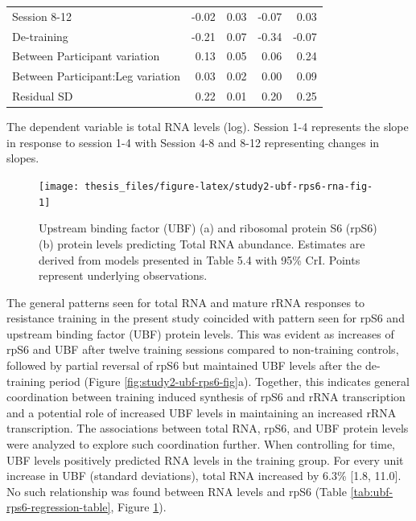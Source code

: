 \documentclass[twoside,10pt]{gihclass} %
\begin{document}
\begin{table}
\begin{threeparttable}
\begin{tabular}[t]{lrrrr}
\hspace{1em}Session 8-12 & -0.02 & 0.03 & -0.07 & 0.03\\
\hspace{1em}De-training & -0.21 & 0.07 & -0.34 & -0.07\\
\hspace{1em}Between Participant variation & 0.13 & 0.05 & 0.06 & 0.24\\
\hspace{1em}Between Participant:Leg variation & 0.03 & 0.02 & 0.00 & 0.09\\
\hspace{1em}Residual SD & 0.22 & 0.01 & 0.20 & 0.25\\
\bottomrule
\end{tabular}
\begin{tablenotes}[para]
\item The dependent variable is total RNA levels (log). Session 1-4 represents the slope in response to session 1-4 with Session 4-8 and 8-12 representing changes in slopes.
\end{tablenotes}
\end{threeparttable}
\end{table}
\begin{figure}

{\centering \texttt{[image: thesis\_files/figure-latex/study2-ubf-rps6-rna-fig-1]} 

}

\caption[Total RNA levels predicted by UBF and rpS6 protein in Study II.]{Upstream binding factor (UBF) (a) and ribosomal protein S6 (rpS6) (b) protein levels predicting Total RNA abundance. Estimates are derived from models presented in Table 5.4 with 95\% CrI. Points represent underlying observations.}\label{fig:study2-ubf-rps6-rna-fig}
\end{figure}
The general patterns seen for total RNA and mature rRNA responses to resistance training in the present study coincided with pattern seen for rpS6 and upstream binding factor (UBF) protein levels. This was evident as increases of rpS6 and UBF after twelve training sessions compared to non-training controls, followed by partial reversal of rpS6 but maintained UBF levels after the de-training period
(Figure \ref{fig:study2-ubf-rps6-fig}a).
Together, this indicates general coordination between training induced synthesis of rpS6 and rRNA transcription and a potential role of increased UBF levels in maintaining an increased rRNA transcription.
The associations between total RNA, rpS6, and UBF protein levels were analyzed to explore such coordination further. When controlling for time, UBF levels positively predicted RNA levels in the training group. For every unit increase in UBF (standard deviations), total RNA increased by 6.3\% {[}1.8, 11.0{]}. No such relationship was found between RNA levels and rpS6 (Table \ref{tab:ubf-rps6-regression-table}, Figure \ref{fig:study2-ubf-rps6-rna-fig}).
\end{document}
